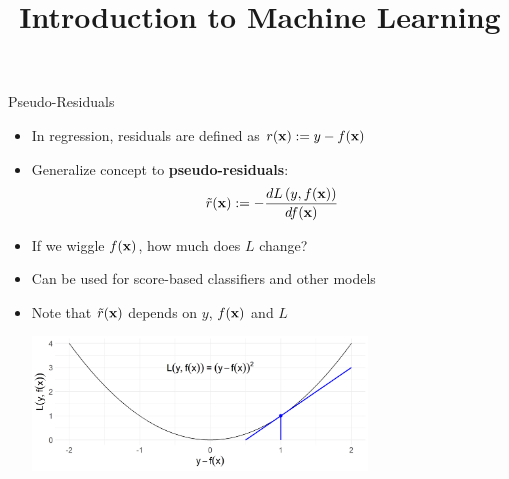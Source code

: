 \documentclass[11pt,compress,t,notes=noshow, xcolor=table]{beamer}
\title{Introduction to Machine Learning}
\begin{document}
    

\begin{vbframe}{Pseudo-Residuals}

\begin{itemize}
\item In regression, residuals are defined as 
$r(\mathbf{x}) := y - f(\mathbf{x})$
\item Generalize concept to \textbf{pseudo-residuals}: 
$$
\tilde{r}(\mathbf{x}) := - \frac{d L\left(y, f(\mathbf{x})\right)}{d f(\mathbf{x})}
$$
\item If we wiggle $f(\mathbf{x})$, how much does $L$ change?
\item Can be used for score-based classifiers and other models
\item Note that $\tilde{r}(\mathbf{x})$ depends on $y$, $f(\mathbf{x})$ and $L$

\vfill

\includegraphics[width=0.7\textwidth]{figure/plot_quad_pseudores.png}

\end{itemize}

\end{vbframe}
\end{document}
